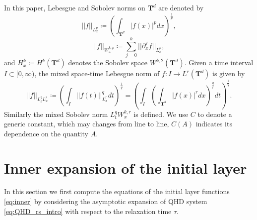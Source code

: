\documentclass[english]{amsart}
\theoremstyle{plain}
\theoremstyle{definition}
\theoremstyle{remark}
\theoremstyle{plain}
\theoremstyle{plain}
\theoremstyle{plain}
\def\T{{\mathbf T}}%
\numberwithin{equation}{section}
\begin{document}
In this paper, Lebesgue and Sobolev norms on ${\T^d}$ are denoted by
\[
||f||_{L_{x}^{p}}\coloneqq(\int_{{\T^d}}|f(x)|^{p}dx)^{\frac{1}{p}},
\]
\[
||f||_{W_{x}^{k,p}}\coloneqq\sum_{j=0}^k||\partial_{x}^{j}f||_{L_{x}^{p}},
\]
and $H_{x}^{k}\coloneqq H^{k}({\T^d})$ denotes the Sobolev space $W^{k,2}({\T^d})$.
Given a time interval $I\subset[0, \infty)$, the mixed space-time Lebesgue norm of $f:I\to L^{r}({\T^d})$ is
given by
\[
||f||_{L_{t}^{q}L_{x}^{r}}\coloneqq\left(\int_{I}||f(t)||_{L_{x}^{r}}^{q}dt\right)^{\frac{1}{q}}=\left(\int_{I}\left(\int_{{\T^d}}|f(x)|^{r}dx\right)^{\frac{q}{r}}dt\right)^{\frac{1}{q}}.
\]
Similarly the mixed Sobolev norm $L_{t}^{q}W_{x}^{k,r}$ is defined. We use $C$ to denote a generic constant, which may changes from line to line, $C(A)$ indicates its dependence on the quantity $A$.

\section{Inner expansion of the initial layer}\label{sect:inner}


In this section we first compute the equations of the initial layer functions \eqref{eq:inner} by considering the asymptotic expansion of QHD system \eqref{eq:QHD_rs_intro} with respect to the relaxation time $\tau$. 
\end{document}
